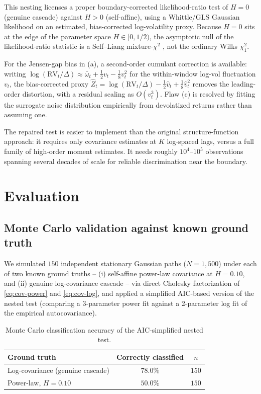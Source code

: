\documentclass[11pt]{article}
\begin{document}
This nesting licenses a proper boundary-corrected likelihood-ratio test of $H=0$ (genuine cascade) against $H>0$ (self-affine), using a Whittle/GLS Gaussian likelihood on an estimated, bias-corrected log-volatility proxy. Because $H=0$ sits at the edge of the parameter space $H\in[0,1/2)$, the asymptotic null of the likelihood-ratio statistic is a Self--Liang mixture-$\chi^2$ \citep{selfliang1987}, not the ordinary Wilks $\chi^2_1$.

For the Jensen-gap bias in (a), a second-order cumulant correction is available: writing $\log(\mathrm{RV}_t/\Delta) \approx \bar\omega_t + \tfrac12 v_t - \tfrac18 v_t^2$ for the within-window log-vol fluctuation $v_t$, the bias-corrected proxy $\hat Z_t = \log(\mathrm{RV}_t/\Delta) - \tfrac12\hat v_t + \tfrac18\hat v_t^2$ removes the leading-order distortion, with a residual scaling as $O(v_t^3)$. Flaw (c) is resolved by fitting the surrogate noise distribution empirically from devolatized returns rather than assuming one.

\begin{finding}
The repaired test is easier to implement than the original structure-function approach: it requires only covariance estimates at $K$ log-spaced lags, versus a full family of high-order moment estimates. It needs roughly $10^4$--$10^5$ observations spanning several decades of scale for reliable discrimination near the boundary.
\end{finding}

\section{Evaluation}

\subsection{Monte Carlo validation against known ground truth}

We simulated $150$ independent stationary Gaussian paths ($N=1{,}500$) under each of two known ground truths -- (i) self-affine power-law covariance at $H=0.10$, and (ii) genuine log-covariance cascade -- via direct Cholesky factorization of \eqref{eq:cov-power} and \eqref{eq:cov-log}, and applied a simplified AIC-based version of the nested test (comparing a 3-parameter power fit against a 2-parameter log fit of the empirical autocovariance).

\begin{table}[h]
\centering
\begin{tabular}{lcc}
\toprule
Ground truth & Correctly classified & $n$ \\
\midrule
Log-covariance (genuine cascade) & $78.0\%$ & $150$ \\
Power-law, $H=0.10$ & $50.0\%$ & $150$ \\
\bottomrule
\end{tabular}
\caption{Monte Carlo classification accuracy of the AIC-simplified nested test.}
\label{tab:mc}
\end{table}
\end{document}
